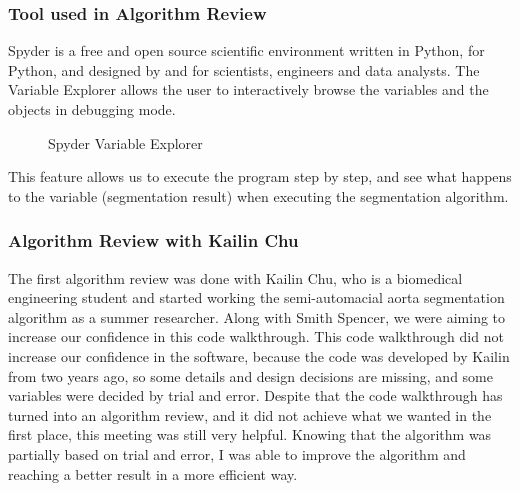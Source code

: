 \subsubsection{Tool used in Algorithm Review}

Spyder is a free and open source scientific environment written in Python, for Python, and designed by and for scientists, engineers and data analysts. The Variable Explorer allows the user to interactively browse the variables and the objects in debugging mode. 
\citep{Spyder}

\begin{figure}[H]
    \centering
    \caption[Spyder Variable Explorer]{Spyder Variable Explorer \cite{raybaut2009spyder}}
    \label{fig_spyder_ve}
\end{figure}

This feature allows us to execute the program step by step, and see what happens to the variable (segmentation result) when executing the segmentation algorithm. 


\subsubsection{Algorithm Review with Kailin Chu}
The first algorithm review was done with Kailin Chu, who is a biomedical engineering student and started working the semi-automacial aorta segmentation algorithm as a summer researcher. Along with Smith Spencer, we were aiming to increase our confidence in this code walkthrough. This code walkthrough did not increase our confidence in the software, because the code was developed by Kailin from two years ago, so some details and design decisions are missing, and some variables were decided by trial and error. Despite that the code walkthrough has turned into an algorithm review, and it did not achieve what we wanted in the first place, this meeting was still very helpful. Knowing that the algorithm was partially based on trial and error, I was able to improve the algorithm and reaching a better result in a more efficient way.

